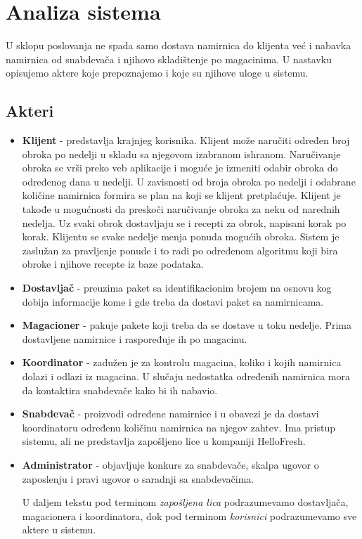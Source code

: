 
\section{Analiza sistema}

	U sklopu poslovanja ne spada samo dostava namirnica do klijenta već i nabavka namirnica od snabdevača i njihovo skladištenje po magacinima. U nastavku opisujemo aktere koje prepoznajemo i koje su njihove uloge u sistemu.

\subsection{Akteri}
	\begin{itemize}
		\item{\textbf{Klijent}} - predstavlja krajnjeg korisnika. Klijent može naručiti određen broj obroka po nedelji u skladu sa njegovom izabranom ishranom. Naručivanje obroka se vrši preko veb aplikacije i moguće je izmeniti odabir obroka do određenog dana u nedelji. U zavisnosti od broja obroka po nedelji i odabrane količine namirnica formira se plan na koji se klijent pretplaćuje. Klijent je takođe u mogućnosti da preskoči naručivanje obroka za neku od narednih nedelja. Uz svaki obrok dostavljaju se i recepti za obrok, napisani korak po korak. Klijentu se svake nedelje menja ponuda mogućih obroka. Sistem je zaslužan za pravljenje ponude i to radi po određenom algoritmu koji bira obroke i njihove recepte iz baze podataka.
		\item{\textbf{Dostavljač}} - preuzima paket sa identifikacionim brojem na osnovu kog dobija informacije kome i gde treba da dostavi paket sa namirnicama.
		\item{\textbf{Magacioner}} - pakuje pakete koji treba da se dostave u toku nedelje. Prima dostavljene namirnice i raspoređuje ih po magacinu.
		\item{\textbf{Koordinator}} - zadužen je za kontrolu magacina, koliko i kojih namirnica dolazi i odlazi iz magacina. U slučaju nedostatka određenih namirnica mora da kontaktira snabdevače kako bi ih nabavio.
		\item{\textbf{Snabdevač}} - proizvodi određene namirnice i u obavezi je da dostavi koordinatoru određenu količinu namirnica na njegov zahtev. Ima pristup sistemu, ali ne predstavlja zapošljeno lice u kompaniji HelloFresh.
		\item{\textbf{Administrator}} - objavljuje konkurs za snabdevače, skalpa ugovor o zaposlenju i pravi ugovor o saradnji sa snabdevačima.
		
		U daljem tekstu pod terminom \textit{zapošljena lica} podrazumevamo dostavljača, magacionera i koordinatora, dok pod terminom \textit{korisnici} podrazumevamo sve aktere u sistemu.
		
				
	\end{itemize}
